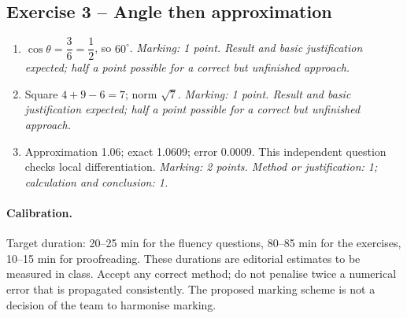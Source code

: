 \subsection*{Exercise 3 -- Angle then approximation}
\begin{enumerate}
\item $\cos \theta =\dfrac{3}{6}=\dfrac{1}{2}$, so $60^\circ$. \textit{Marking: 1 point. Result and basic justification expected; half a point possible for a correct but unfinished approach.}
\item Square $4+9-6=7$; norm $\sqrt7$. \textit{Marking: 1 point. Result and basic justification expected; half a point possible for a correct but unfinished approach.}
\item Approximation \num{1,06}; exact \num{1,0609}; error \num{0,0009}. This independent question checks local differentiation. \textit{Marking: 2 points. Method or justification: 1; calculation and conclusion: 1.}
\end{enumerate}
\paragraph{Calibration.} Target duration: 20--25 min for the fluency questions, 80--85 min for the exercises, 10--15 min for proofreading. These durations are editorial estimates to be measured in class. Accept any correct method; do not penalise twice a numerical error that is propagated consistently. The proposed marking scheme is not a decision of the team to harmonise marking.
